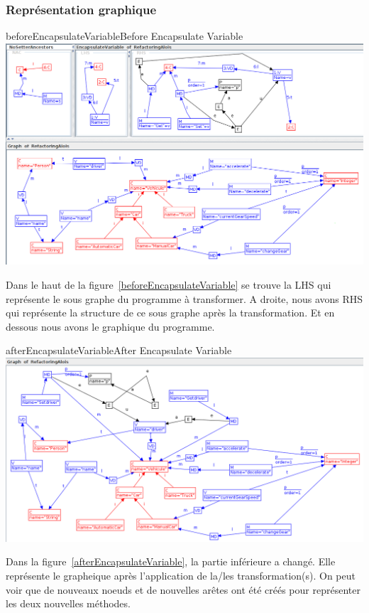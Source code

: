 \documentclass[a4paper, 12pt]{article}
\begin{document}
  \subsubsection{Représentation graphique}

  \begin{myfig}{beforeEncapsulateVariable}{Before Encapsulate Variable}
    \includegraphics[width=\textwidth]{beforeEncapsulateVariable.png}
  \end{myfig}

  Dans le haut de la figure~\ref{beforeEncapsulateVariable} se trouve la LHS qui représente le sous graphe du programme à transformer.
  A droite, nous avons RHS qui représente la structure de ce sous graphe après la transformation.
  Et en dessous nous avons le graphique du programme.

  \begin{myfig}{afterEncapsulateVariable}{After Encapsulate Variable}
    \includegraphics[width=\textwidth]{afterEncapsulateVariable.png}
  \end{myfig}

  Dans la figure~\ref{afterEncapsulateVariable}, la partie inférieure a changé.
  Elle représente le grapheique après l'application de la/les transformation(s). On peut voir que de nouveaux noeuds et de nouvelles arêtes ont été créés pour représenter les deux nouvelles méthodes.
\end{document}
